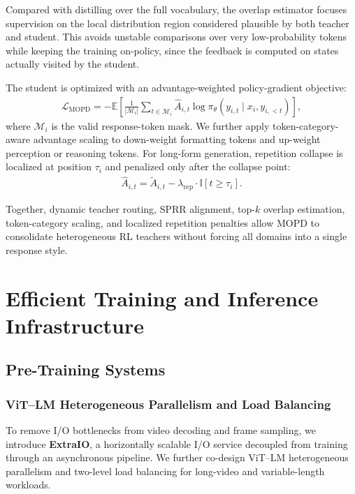 \documentclass{llmxive}
\begin{document}
Compared with distilling over the full vocabulary, the overlap estimator focuses supervision on the local distribution region considered plausible by both teacher and student. This avoids unstable comparisons over very low-probability tokens while keeping the training on-policy, since the feedback is computed on states actually visited by the student.

The student is optimized with an advantage-weighted policy-gradient objective:
\begin{align}
    \mathcal{L}_{\mathrm{MOPD}}=
    -\mathbb{E}
    \left[
    \frac{1}{|\mathcal{M}_i|}
    \sum_{t\in \mathcal{M}_i}
    \widehat{A}_{i,t}
    \log \pi_\theta(y_{i,t}\mid x_i,y_{i,<t})
    \right],
\end{align}
where $\mathcal{M}_i$ is the valid response-token mask. We further apply token-category-aware advantage scaling to down-weight formatting tokens and up-weight perception or reasoning tokens. For long-form generation, repetition collapse is localized at position $\tau_i$ and penalized only after the collapse point:
\begin{align}
    \widehat{A}_{i,t}=
    \widetilde{A}_{i,t} -
    \lambda_{\mathrm{rep}}\cdot \mathbb{I}[t\ge \tau_i].
\end{align}

Together, dynamic teacher routing, SPRR alignment, top-$k$ overlap estimation, token-category scaling, and localized repetition penalties allow MOPD to consolidate heterogeneous RL teachers without forcing all domains into a single response style.


\section{Efficient Training and Inference Infrastructure}

\subsection{Pre-Training Systems}

\subsubsection{ViT--LM Heterogeneous Parallelism and Load Balancing}

To remove I/O bottlenecks from video decoding and frame sampling, we introduce \textbf{ExtraIO}, a horizontally scalable I/O service decoupled from training through an asynchronous pipeline. We further co-design ViT--LM heterogeneous parallelism and two-level load balancing for long-video and variable-length workloads.
\end{document}
